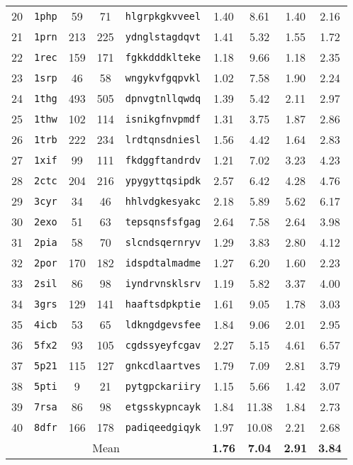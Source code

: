 \begin{table}[!h]
\begin{tabular}{|c|l|c|c|c|c|c|c|c|}
  20 & {\tt 1php} & 59 & 71 & {\tt hlgrpkgkvveel} & 1.40 & 8.61 & 1.40 & 2.16\\
  21 & {\tt 1prn} & 213 & 225 & {\tt ydnglstagdqvt} & 1.41 & 5.32 & 1.55 & 1.72\\
  22 & {\tt 1rec} & 159 & 171 & {\tt fgkkdddklteke} & 1.18 & 9.66 & 1.18 & 2.35\\
  23 & {\tt 1srp} & 46 & 58 & {\tt wngykvfgqpvkl} & 1.02 & 7.58 & 1.90 & 2.24\\
  24 & {\tt 1thg} & 493 & 505 & {\tt dpnvgtnllqwdq} & 1.39 & 5.42 & 2.11 & 2.97\\
  25 & {\tt 1thw} & 102 & 114 & {\tt isnikgfnvpmdf} & 1.31 & 3.75 & 1.87 & 2.86\\
  26 & {\tt 1trb} & 222 & 234 & {\tt lrdtqnsdniesl} & 1.56 & 4.42 & 1.64 & 2.83\\
  27 & {\tt 1xif} & 99 & 111 & {\tt fkdggftandrdv} & 1.21 & 7.02 & 3.23 & 4.23\\
  28 & {\tt 2ctc} & 204 & 216 & {\tt ypygyttqsipdk} & 2.57 & 6.42 & 4.28 & 4.76\\
  29 & {\tt 3cyr} & 34 & 46 & {\tt hhlvdgkesyakc} & 2.18 & 5.89 & 5.62 & 6.17\\
  30 & {\tt 2exo} & 51 & 63 & {\tt tepsqnsfsfgag} & 2.64 & 7.58 & 2.64 & 3.98\\
  31 & {\tt 2pia} & 58 & 70 & {\tt slcndsqernryv} & 1.29 & 3.83 & 2.80 & 4.12\\
  32 & {\tt 2por} & 170 & 182 & {\tt idspdtalmadme} & 1.27 & 6.20 & 1.60 & 2.23\\
  33 & {\tt 2sil} & 86 & 98 & {\tt iyndrvnsklsrv} & 1.19 & 5.82 & 3.37 & 4.00\\
  34 & {\tt 3grs} & 129 & 141 & {\tt haaftsdpkptie} & 1.61 & 9.05 & 1.78 & 3.03\\
  35 & {\tt 4icb} & 53 & 65 & {\tt ldkngdgevsfee} & 1.84 & 9.06 & 2.01 & 2.95\\
  36 & {\tt 5fx2} & 93 & 105 & {\tt cgdssyeyfcgav} & 2.27 & 5.15 & 4.61 & 6.57\\
  37 & {\tt 5p21} & 115 & 127 & {\tt gnkcdlaartves} & 1.79 & 7.09 & 2.81 & 3.79\\
  38 & {\tt 5pti} & 9 & 21 & {\tt pytgpckariiry} & 1.15 & 5.66 & 1.42 & 3.07\\
  39 & {\tt 7rsa} & 86 & 98 & {\tt etgsskypncayk} & 1.84 & 11.38 & 1.84 & 2.73\\
  40 & {\tt 8dfr} & 166 & 178 & {\tt padiqeedgiqyk} & 1.97 & 10.08 & 2.21 & 2.68\\
  \hline
  \multicolumn{5}{|c|}{Mean} & \textbf{1.76} & \textbf{7.04} & \textbf{2.91} & \textbf{3.84}\\

\end{tabular}
\end{table}
